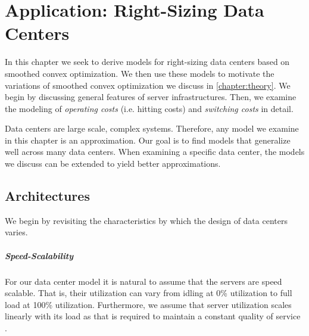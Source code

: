 
\chapter{Application: Right-Sizing Data Centers}\label{chapter:application}

In this chapter we seek to derive models for right-sizing data centers based on smoothed convex optimization. We then use these models to motivate the variations of smoothed convex optimization we discuss in \autoref{chapter:theory}. We begin by discussing general features of server infrastructures. Then, we examine the modeling of \emph{operating costs} (i.e. hitting costs) and \emph{switching costs} in detail.

Data centers are large scale, complex systems. Therefore, any model we examine in this chapter is an approximation. Our goal is to find models that generalize well across many data centers. When examining a specific data center, the models we discuss can be extended to yield better approximations.

\section{Architectures}\label{section:application:architectures}

We begin by revisiting the characteristics by which the design of data centers varies.

\paragraph{Speed-Scalability} For our data center model it is natural to assume that the servers are speed scalable. That is, their utilization can vary from idling at 0\% utilization to full load at 100\% utilization. Furthermore, we assume that server utilization scales linearly with its load as that is required to maintain a constant quality of service \cite{Bansal2015}.

